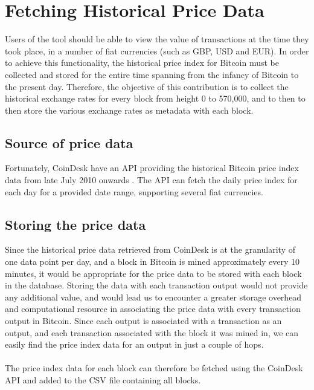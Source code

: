 \chapter{Fetching Historical Price Data}\label{section-price-data}
Users of the tool should be able to view the value of transactions at the time they took place, in a number of fiat currencies (such as GBP, USD and EUR). In order to achieve this functionality, the historical price index for Bitcoin must be collected and stored for the entire time spanning from the infancy of Bitcoin to the present day. Therefore, the objective of this contribution is to collect the historical exchange rates for every block from height 0 to 570,000, and to then to then store the various exchange rates as metadata with each block. 

\section{Source of price data}
Fortunately, CoinDesk have an API providing the historical Bitcoin price index data from late July 2010 onwards \cite{RefWorks:doc:5cacd8cbe4b092e311880f2b}. The API can fetch the daily price index for each day for a provided date range, supporting several fiat currencies.

\section{Storing the price data}
Since the historical price data retrieved from CoinDesk is at the granularity of one data point per day, and a block in Bitcoin is mined approximately every 10 minutes, it would be appropriate for the price data to be stored with each block in the database. Storing the data with each transaction output would not provide any additional value, and would lead us to encounter a greater storage overhead and computational resource in associating the price data with every transaction output in Bitcoin. Since each output is associated with a transaction as an output, and each transaction associated with the block it was mined in, we can easily find the price index data for an output in just a couple of hops. 
\\\\
The price index data for each block can therefore be fetched using the CoinDesk API and added to the CSV file containing all blocks.

